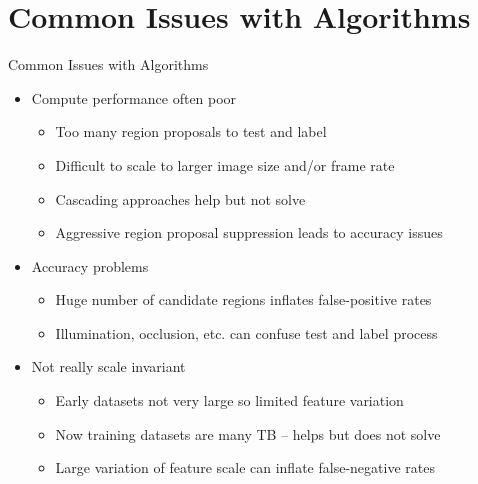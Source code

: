 \documentclass[handout]{beamer}
\begin{document}
\section{Common Issues with Algorithms}
\begin{frame}{Common Issues with Algorithms}
\begin{itemize}
\itemsep1em
	\item<1->Compute performance often poor 
		\begin{itemize}[square]
			\item<1->Too many region proposals to test and label
			\item<2->Difficult to scale to larger image size and/or frame rate
			\item<3->Cascading approaches help but not solve
			\item<4->Aggressive region proposal suppression leads to accuracy issues
		\end{itemize}
	\item<2->Accuracy problems
		\begin{itemize}[square]
			\item<1->Huge number of candidate regions inflates false-positive rates
			\item<2->Illumination, occlusion, etc. can confuse test and label process
		\end{itemize}
	\item<3->Not really scale invariant
		\begin{itemize}[square]
			\item<1->Early datasets not very large so limited feature variation
			\item<2->Now training datasets are many TB -- helps but does not solve
			\item<3->Large variation of feature scale can inflate false-negative rates
		\end{itemize}
\end{itemize}
\end{frame}
\end{document}
